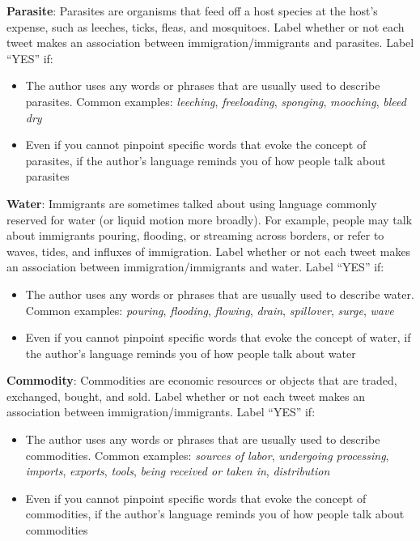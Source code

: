 \begin{table*}[htbp!]
\begin{tcolorbox}[colback=white, colframe=white!30!black, boxrule=1pt, arc=4mm, width=\textwidth, boxrule=1pt,title=Codebook,fontupper=\footnotesize]
\textbf{Parasite}: Parasites are organisms that feed off a host species at the host’s expense, such as leeches, ticks, fleas, and mosquitoes. Label whether or not each tweet makes an association between immigration/immigrants and parasites. Label “YES” if: 
\begin{itemize}[noitemsep, topsep=0pt]
    \item The author uses any words or phrases that are usually used to describe parasites. Common examples: \textit{leeching}, \textit{freeloading}, \textit{sponging}, \textit{mooching}, \textit{bleed dry}
    \item Even if you cannot pinpoint specific words that evoke the concept of parasites, if the author's language reminds you of how people talk about parasites
\end{itemize}


\textbf{Water}: Immigrants are sometimes talked about using language commonly reserved for water (or liquid motion more broadly). For example, people may talk about immigrants pouring, flooding, or streaming across borders, or refer to waves, tides, and influxes of immigration. Label whether or not each tweet makes an association between immigration/immigrants and water. Label “YES” if: 

\begin{itemize}[noitemsep, topsep=0pt]
    \item The author uses any words or phrases that are usually used to describe water. Common examples: \textit{pouring}, \textit{flooding}, \textit{flowing}, \textit{drain}, \textit{spillover}, \textit{surge}, \textit{wave}
    \item Even if you cannot pinpoint specific words that evoke the concept of water, if the author's language reminds you of how people talk about water
\end{itemize}


\textbf{Commodity}: Commodities are economic resources or objects that are traded, exchanged, bought, and sold. Label whether or not each tweet makes an association between immigration/immigrants. Label ``YES'' if:
\begin{itemize}[noitemsep, topsep=0pt]
    \item The author uses any words or phrases that are usually used to describe commodities. Common examples: \textit{sources of labor}, \textit{undergoing processing}, \textit{imports}, \textit{exports}, \textit{tools}, \textit{being received or taken in}, \textit{distribution}
    \item Even if you cannot pinpoint specific words that evoke the concept of commodities, if the author's language reminds you of how people talk about commodities
\end{itemize}



\end{tcolorbox}
\end{table*}
